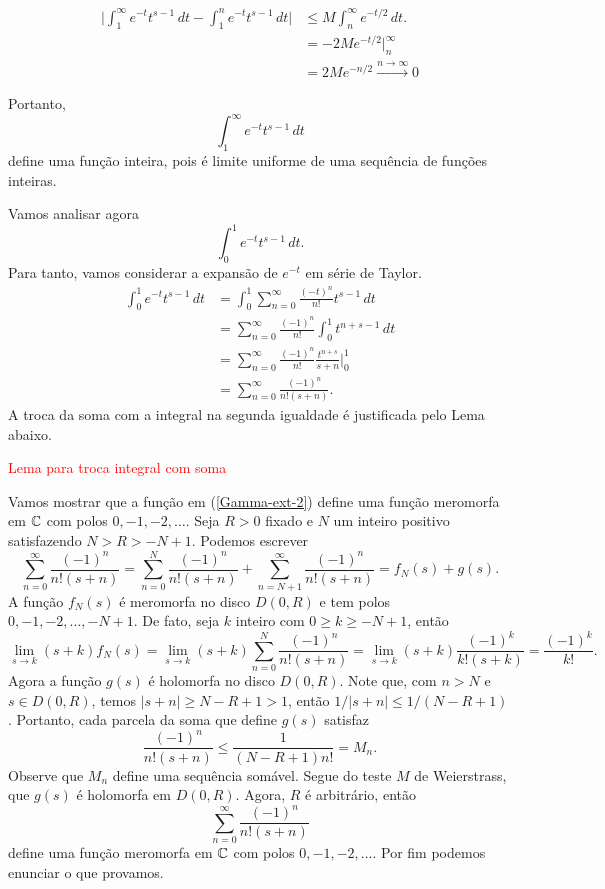    \begin{align*}
        \Big | \int_{1}^{\infty}e^{-t}t^{s-1} \, dt - \int_{1}^{n}e^{-t}t^{s-1} \, dt \Big | &\leq M \int_{n}^{\infty}e^{-t/2} \, dt.\\
        &= -2M e^{-t/2} \Big |_{n}^{\infty} \\
        &= 2M e^{-n/2} \xrightarrow{n \to \infty} 0
    \end{align*}
    
    Portanto,
    \[
    \int_{1}^{\infty}e^{-t}t^{s-1} \, dt
    \]
    define uma função inteira, pois é limite uniforme de uma sequência de funções inteiras.
    
    Vamos analisar agora 
    \[
    \int_{0}^{1}e^{-t}t^{s-1} \, dt.
    \]
    Para tanto, vamos considerar a expansão de $e^{-t}$ em série de Taylor. 
    \begin{align}
    \label{Gamma-ext-2}
        \int_{0}^{1}e^{-t}t^{s-1} \, dt &=  \int_{0}^{1}\sum_{n=0}^{\infty}\frac{(-t)^n}{n!} t^{s-1} \, dt \\
        &= \sum_{n=0}^{\infty} \frac{(-1)^n}{n!}\int_{0}^{1}t^{n + s-1} \, dt \\
        &= \sum_{n=0}^{\infty} \frac{(-1)^n}{n!}\frac{t^{n + s}}{s+n} \Big |_{0}^{1} \\
        &= \sum_{n=0}^{\infty} \frac{(-1)^n}{n!(s+n)}.
    \end{align}
    A troca da soma com a integral na segunda igualdade é justificada pelo Lema abaixo.
    \begin{lema}
    \textcolor{red}{Lema para troca integral com soma}
    \end{lema}
    Vamos mostrar que a função em (\ref{Gamma-ext-2}) define uma função meromorfa em $\mathbb{C}$ com polos $0,-1,-2,\dots$. Seja $R>0$ fixado e $N$ um inteiro positivo satisfazendo $N>R>-N+1$. Podemos escrever
    $$ \sum_{n=0}^{\infty} \frac{(-1)^n}{n!(s+n)} = \sum_{n=0}^{N} \frac{(-1)^n}{n!(s+n)} + \sum_{n=N+1}^{\infty} \frac{(-1)^n}{n!(s+n)} = f_N(s) + g(s).$$
    A função $f_N(s)$ é meromorfa no disco $D(0,R)$ e tem polos $0,-1,-2,\dots,-N+1$. De fato, seja $k$ inteiro com $0 \geq k \geq -N+1$, então
    $$\lim_{s \to k} (s+k)f_N(s) = \lim_{s \to k} (s+k)\sum_{n=0}^{N} \frac{(-1)^n}{n!(s+n)} = \lim_{s \to k} (s+k)\frac{(-1)^k}{k!(s+k)} = \frac{(-1)^k}{k!}.$$
    Agora a função $g(s)$ é holomorfa no disco $D(0,R)$. Note que, com $n > N$ e $s \in D(0,R)$, temos $|s+n| \geq N-R+1 > 1$, então
    $1/|s+n| \leq 1/(N-R+1)$. Portanto, cada parcela da soma que define $g(s)$ satisfaz
    $$\frac{(-1)^n}{n!(s+n)} \leq \frac{1}{(N-R+1)n!} = M_n.$$
    Observe que $M_n$ define uma sequência somável. Segue do teste $M$ de Weierstrass, que $g(s)$ é holomorfa em $D(0,R)$. Agora, $R$ é arbitrário, então
    $$\sum_{n=0}^{\infty} \frac{(-1)^n}{n!(s+n)}$$
    define uma função meromorfa em $\mathbb{C}$ com polos $0,-1,-2, \dots$. Por fim podemos enunciar o que provamos.
    
